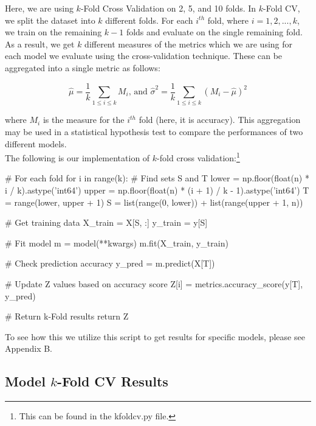 \documentclass[fleqn]{article}
\begin{document}
    Here, we are using $k$-Fold Cross Validation on 2, 5, and 10 folds. In $k$-Fold CV, we
    split the dataset into $k$ different folds. For each $i^{th}$ fold, where
    $ i = 1, 2,...,k $, we train on the remaining $ k-1 $ folds and evaluate on the single
    remaining fold. As a result, we get $ k $ different measures of the metrics which we
    are using for each model we evaluate using the cross-validation technique. These can
    be aggregated into a single metric as follows:

    $$  \hat\mu = \frac{1}{k} \sum_{1\leq i \leq k} M_i \text{, and }
        \hat\sigma^2 = \frac{1}{k} \sum_{1\leq i \leq k} (M_i - \hat\mu)^2 $$

    \noindent
    where $ M_i $ is the measure for the $i^{th}$ fold (here, it is accuracy). This
    aggregation may be used in a statistical hypothesis test to compare the performances
    of two different models.\\

    \noindent
    The following is our implementation of $k$-fold cross validation:\footnote{This can be
    found in the kfoldcv.py file.}

    \begin{python}
    # For each fold
    for i in range(k):
        # Find sets S and T
        lower = np.floor(float(n) * i / k).astype('int64')
        upper = np.floor(float(n) * (i + 1) / k - 1).astype('int64')
        T = range(lower, upper + 1)
        S = list(range(0, lower)) + list(range(upper + 1, n))

        # Get training data
        X_train = X[S, :]
        y_train = y[S]

        # Fit model
        m = model(**kwargs)
        m.fit(X_train, y_train)

        # Check prediction accuracy
        y_pred = m.predict(X[T])

        # Update Z values based on accuracy score
        Z[i] = metrics.accuracy_score(y[T], y_pred)

    # Return k-Fold results
    return Z
    \end{python}

    \noindent
    To see how this we utilize this script to get results for specific models, please see
    Appendix B.

    \subsection{Model $k$-Fold CV Results}
\end{document}

